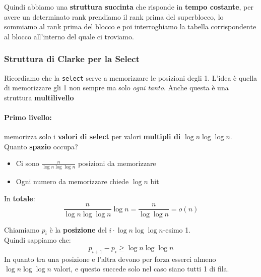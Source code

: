 Quindi abbiamo una \textbf{struttura succinta} che risponde in \textbf{tempo costante}, per avere un determinato rank prendiamo il rank prima del superblocco, lo sommiamo al rank prima del blocco e poi interroghiamo la tabella corrispondente al blocco all'interno del quale ci troviamo.\\


\newpage

\subsubsection{Struttura di Clarke per la Select}

Ricordiamo che la \texttt{select} serve a memorizzare le posizioni degli 1. L'idea è quella di memorizzare gli 1 non sempre ma solo \textit{ogni tanto}. Anche questa è una struttura \textbf{multilivello}\\

\paragraph{Primo livello:} memorizza solo i \textbf{valori di select} per valori \textbf{multipli di} $\log n \log \log n$.\\

Quanto \textbf{spazio} occupa? 
\begin{itemize}
	\item Ci sono $\frac{n}{\log n \log \log n}$ posizioni da memorizzare
	\item Ogni numero da memorizzare chiede $\log n$ bit
\end{itemize}

In \textbf{totale}: 
$$ \frac{n}{ \log n \log \log n} \log n = \frac{n}{\log \log n} = o(n) $$

Chiamiamo $p_i$ è la \textbf{posizione} del $i \cdot \log n \log \log n$-esimo 1.\\
Quindi sappiamo che:
$$ p_{i+1} - p_i \geq \log n \log \log n $$
In quanto tra una posizione e l'altra devono per forza esserci almeno $\log n \log \log n$ valori, e questo succede solo nel caso siano tutti 1 di fila.\\

\newpage

